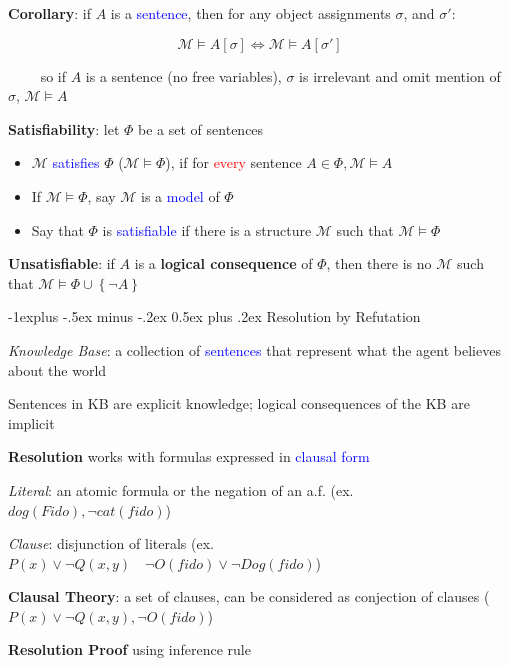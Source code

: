 \documentclass[7pt,landscape]{article}
\makeatletter
\renewcommand{\subsection}{\@startsection{subsection}{2}{0mm}%
                                {-1explus -.5ex minus -.2ex}%
                                {0.5ex plus .2ex}%
                                {\normalfont\normalsize\bfseries}}
\makeatother
\begin{document}
\begin{multicols}{2}
\textbf{Corollary}: if $A$ is a \textcolor{blue}{sentence}, then for any object assignments $\sigma$, and $\sigma'$:

$$ \mathcal{M} \vDash A \left[ \sigma \right] \iff \mathcal{M} \vDash A \left[ \sigma' \right] $$

$\quad \quad$ so if $A$ is a sentence (no free variables), $\sigma$ is irrelevant and omit mention of $\sigma$, $\mathcal{M} \vDash A$

\textbf{Satisfiability}: let $\Phi$ be a set of sentences

\begin{itemize}
    \item $\mathcal{M}$ \textcolor{blue}{satisfies} $\Phi$ ($\mathcal{M} \vDash \Phi$), if for \textcolor{red}{every} sentence $A \in \Phi, \mathcal{M} \vDash A$
    \item If $\mathcal{M} \vDash \Phi$, say $\mathcal{M}$ is a \textcolor{blue}{model} of $\Phi$
    \item Say that $\Phi$ is \textcolor{blue}{satisfiable} if there is a structure $\mathcal{M}$ such that $\mathcal{M} \vDash \Phi$
\end{itemize}

\textbf{Unsatisfiable}: if $A$ is a \textbf{logical consequence} of $\Phi$, then there is no $\mathcal{M}$ such that $\mathcal{M} \vDash \Phi \cup \left\{ \neg A \right\}$

\subsection{Resolution by Refutation}

\textit{Knowledge Base}: a collection of \textcolor{blue}{sentences} that represent what the agent believes about the world 

Sentences in KB are explicit knowledge; logical consequences of the KB are implicit 

\textbf{Resolution} works with formulas expressed in \textcolor{blue}{clausal form}

\textit{Literal}: an atomic formula or the negation of an a.f. (ex. $dog(Fido), \neg cat(fido)$)

\textit{Clause}: disjunction of literals (ex. $P(x) \lor \neg Q(x, y) \quad \neg O(fido) \lor \neg Dog(fido)$)

\textbf{Clausal Theory}: a set of clauses, can be considered as conjection of clauses ($P(x) \lor \neg Q(x, y), \neg O(fido)$)

\textbf{Resolution Proof} using inference rule


\end{multicols}
\end{document}
